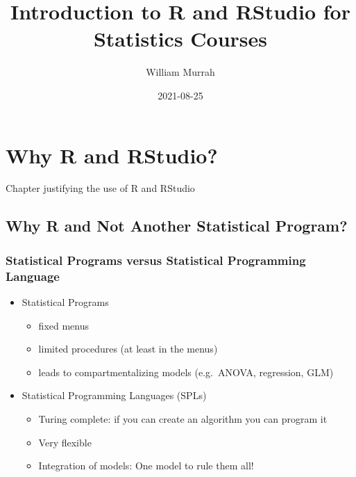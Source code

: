 \documentclass[
]{book}
\title{Introduction to R and RStudio for Statistics Courses}
\author{William Murrah}
\date{2021-08-25}
\providecommand{\tightlist}{%
  \setlength{\itemsep}{0pt}\setlength{\parskip}{0pt}}
\begin{document}
\maketitle

{
\setcounter{tocdepth}{1}
\tableofcontents
}
\hypertarget{intro}{%
\chapter{Why R and RStudio?}\label{intro}}

Chapter justifying the use of R and RStudio

\hypertarget{why-r-and-not-another-statistical-program}{%
\section{Why R and Not Another Statistical Program?}\label{why-r-and-not-another-statistical-program}}

\hypertarget{statistical-programs-versus-statistical-programming-language}{%
\subsection{Statistical Programs versus Statistical Programming Language}\label{statistical-programs-versus-statistical-programming-language}}

\begin{itemize}
\tightlist
\item
  Statistical Programs

  \begin{itemize}
  \tightlist
  \item
    fixed menus
  \item
    limited procedures (at least in the menus)
  \item
    leads to compartmentalizing models (e.g.~ANOVA, regression, GLM)
  \end{itemize}
\item
  Statistical Programming Languages (SPLs)

  \begin{itemize}
  \tightlist
  \item
    Turing complete: if you can create an algorithm you can program it
  \item
    Very flexible
  \item
    Integration of models: One model to rule them all!
  \end{itemize}
\end{itemize}
\end{document}
